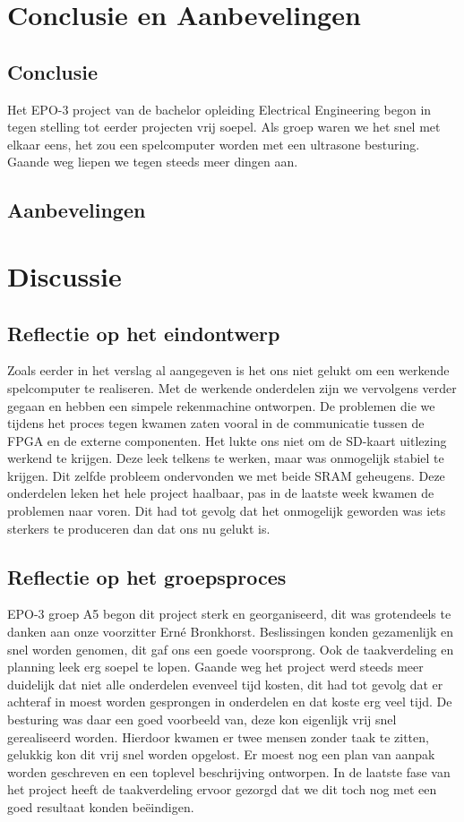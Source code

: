 \documentclass[oneside,dutch]{tudelft-report}
\begin{document}
\chapter{Conclusie en Aanbevelingen}
\section{Conclusie}
Het EPO-3 project van de bachelor opleiding Electrical Engineering begon in tegen stelling tot eerder projecten vrij soepel. Als groep waren we het snel met elkaar eens, het zou een spelcomputer worden met een ultrasone besturing. Gaande weg liepen we tegen steeds meer dingen aan. 

\section{Aanbevelingen}

\chapter{Discussie}
\section{Reflectie op het eindontwerp}
Zoals eerder in het verslag al aangegeven is het ons niet gelukt om een werkende spelcomputer te realiseren. Met de werkende onderdelen zijn we vervolgens verder gegaan en hebben een simpele rekenmachine ontworpen. De problemen die we tijdens het proces tegen kwamen zaten vooral in de communicatie tussen de FPGA en de externe componenten. Het lukte ons niet om de SD-kaart uitlezing werkend te krijgen. Deze leek telkens te werken, maar was onmogelijk stabiel te krijgen. Dit zelfde probleem ondervonden we met beide SRAM geheugens. Deze onderdelen leken het hele project haalbaar, pas in de laatste week kwamen de problemen naar voren. Dit had tot gevolg dat het onmogelijk geworden was iets sterkers te produceren dan dat ons nu gelukt is. 

\section{Reflectie op het groepsproces}
EPO-3 groep A5 begon dit project sterk en georganiseerd, dit was grotendeels te danken aan onze voorzitter Erné Bronkhorst. Beslissingen konden gezamenlijk en snel worden genomen, dit gaf ons een goede voorsprong. Ook de taakverdeling en planning leek erg soepel te lopen. Gaande weg het project werd steeds meer duidelijk dat niet alle onderdelen evenveel tijd kosten, dit had tot gevolg dat er achteraf in moest worden gesprongen in onderdelen en dat koste erg veel tijd. De besturing was daar een goed voorbeeld van, deze kon eigenlijk vrij snel gerealiseerd worden. Hierdoor kwamen er twee mensen zonder taak te zitten, gelukkig kon dit vrij snel worden opgelost. Er moest nog een plan van aanpak worden geschreven en een toplevel beschrijving ontworpen. In de laatste fase van het project heeft de taakverdeling ervoor gezorgd dat we dit toch nog met een goed resultaat konden beëindigen. 
\end{document}
